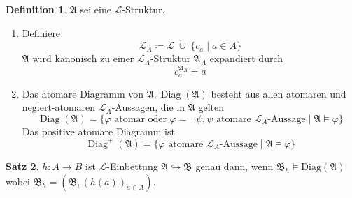 \documentclass[12pt,parskip=full]{scrartcl}
\theoremstyle{definition}
\newtheorem{theorem}{Satz}[section]
\newtheorem{definition}[theorem]{Definition}
\begin{document}
	\begin{definition}
		$\mathfrak{A}$ sei eine $\mathcal{L}$-Struktur.
		\begin{enumerate}
			\item Definiere
			\begin{equation*}
				\mathcal{L}_A \coloneqq \mathcal{L} \;\dot{\cup}\; \{ c_a \mid a \in A \}
			\end{equation*}
			$\mathfrak{A}$ wird kanonisch zu einer $\mathcal{L}_A$-Struktur $\mathfrak{A}_A$ expandiert durch
			\begin{equation*}
				c_a^{\mathfrak{A}_A} = a
			\end{equation*}
			\item Das atomare Diagramm von $\mathfrak{A}, \operatorname{Diag}(\mathfrak{A})$ besteht aus allen atomaren und negiert-atomaren $\mathcal{L}_A$-Aussagen, die in $\mathfrak{A}$ gelten
			\begin{equation*}
				\operatorname{Diag}(\mathfrak{A}) = \{ \text{$\varphi$ atomar oder $\varphi = \lnot \psi, \psi$ atomare $\mathcal{L}_A$-Aussage} \mid \mathfrak{A} \models \varphi \}
			\end{equation*}
			Das positive atomare Diagramm ist
			\begin{equation*}
				\operatorname{Diag}^+(\mathfrak{A}) = \{ \text{$\varphi$ atomare $\mathcal{L}_A$-Aussage} \mid \mathfrak{A} \models \varphi \}
			\end{equation*}
		\end{enumerate}
	\end{definition}

	\begin{theorem}
		$h: A \to B$ ist $\mathcal{L}$-Einbettung $\mathfrak{A} \hookrightarrow \mathfrak{B}$ genau dann, wenn $\mathfrak{B}_h \models \operatorname{Diag(\mathfrak{A})}$ wobei $\mathfrak{B}_h = \left(\mathfrak{B}, (h(a))_{a \in A} \right)$.
	\end{theorem}
\end{document}
